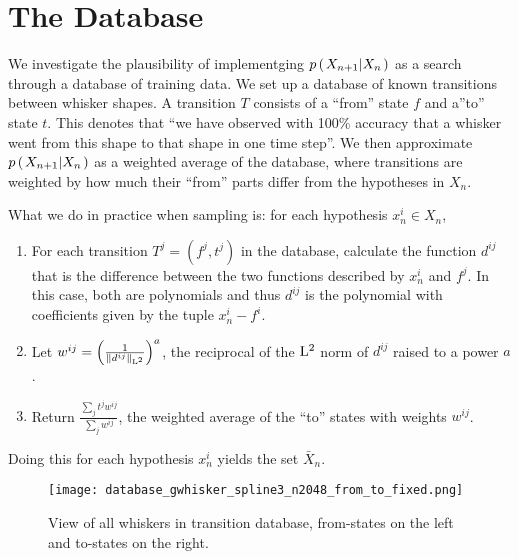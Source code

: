 \section*{The Database}

We investigate the plausibility of implementging $p\left(\left. X_{n+1} \middle\vert X_n \right.\right)$ as a search through a database of training data. We set up a database of known transitions between whisker shapes. A transition $T$ consists of a ``from'' state $f$ and a''to'' state $t$. This denotes that ``we have observed with 100\% accuracy that a whisker went from this shape to that shape in one time step''. We then approximate $p\left(\left. X_{n+1} \middle\vert X_n \right.\right)$ as a weighted average of the database, where transitions are weighted by how much their ``from'' parts differ from the hypotheses in $X_n$.

What we do in practice when sampling is: for each hypothesis $x_n^i \in X_n$,

\begin{enumerate}
  \item For each transition $T^j = (f^j, t^j)$ in the database, calculate the function $d^{ij}$ that is the difference between the two functions described by $x_n^i$ and $f^j$. In this case, both are polynomials and thus $d^{ij}$ is the polynomial with coefficients given by the tuple $x_n^i - f^i$.
  \item Let $w^{ij} = \left(\frac{1}{\left\|d^{ij}\right\|_{\mathrm{L}^2}}\right)^a$, the reciprocal of the $\mathrm{L}^2$ norm of $d^{ij}$ raised to a power $a$.
  \item Return $\frac{\sum_j t^j w^{ij}}{\sum_jw^{ij}}$, the weighted average of the ``to'' states with weights $w^{ij}$.
\end{enumerate}

Doing this for each hypothesis $x_n^i$ yields the set $\bar{X}_n$.

\begin{figure}
  \centering
  \texttt{[image: database\_gwhisker\_spline3\_n2048\_from\_to\_fixed.png]}
  \caption{View of all whiskers in transition database, from-states on the left and to-states on the right.}
  \label{fig:database}
\end{figure}
